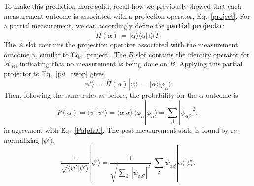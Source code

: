 \documentclass[pra,12pt]{revtex4-2}
\begin{document}
To make this prediction more solid, recall how we previously showed
that each measurement outcome is associated with a projection
operator, Eq.~\eqref{project}.  For a partial measurement, we can
accordingly define the \textbf{partial projector}
\begin{equation}
  \hat{\Pi}(\alpha) \,=\, |\alpha\rangle\langle \alpha| \otimes  \hat{I}.
\end{equation}
The $A$ slot contains the projection operator associated with the
measurement outcome $\alpha$, similar to Eq.~\eqref{project}.  The $B$
slot contains the identity operator for $\mathscr{H}_B$, indicating
that no measurement is being done on $B$.  Applying this partial
projector to Eq.~\eqref{psi_twop} gives
\begin{equation}
  |\psi'\rangle \,=\, \hat{\Pi}(\alpha)\, |\psi\rangle
  \,=\, |\alpha\rangle |\varphi_\alpha\rangle.
\end{equation}
Then, following the same rules as before, the probability for the
$\alpha$ outcome is
\begin{equation}
  P(\alpha) = \langle\psi'|\psi'\rangle
  = \langle \alpha|\alpha\rangle\, \langle \varphi_\alpha|\varphi_\alpha\rangle
  = \sum_\beta |\psi_{\alpha\beta}|^2,
\end{equation}
in agreement with Eq.~\eqref{Palpha0}.  The post-measurement state is
found by re-normalizing $|\psi'\rangle$:
\begin{equation}
  \frac{1}{\sqrt{\langle\psi'|\psi'\rangle}} |\psi'\rangle
  =
  \frac{1}{\sqrt{\sum_{\beta'} |\psi_{\alpha\beta'}|^2}}\;
  \sum_{\beta} \psi_{\alpha\beta} |\alpha\rangle |\beta\rangle.
\end{equation}
\end{document}
